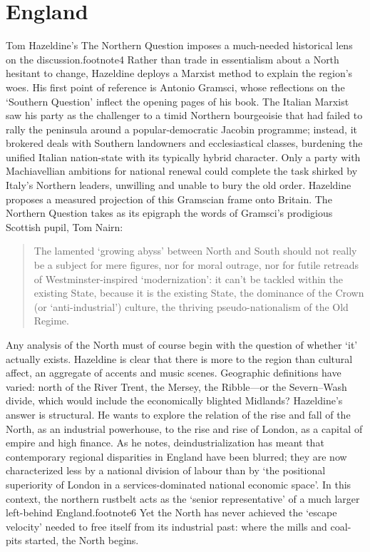 \documentclass[
]{book}
\begin{document}
\hypertarget{england}{%
\chapter{England}\label{england}}

Tom Hazeldine's The Northern Question imposes a much-needed historical lens on the discussion.footnote4 Rather than trade in essentialism about a North hesitant to change, Hazeldine deploys a Marxist method to explain the region's woes. His first point of reference is Antonio Gramsci, whose reflections on the `Southern Question' inflect the opening pages of his book. The Italian Marxist saw his party as the challenger to a timid Northern bourgeoisie that had failed to rally the peninsula around a popular-democratic Jacobin programme; instead, it brokered deals with Southern landowners and ecclesiastical classes, burdening the unified Italian nation-state with its typically hybrid character. Only a party with Machiavellian ambitions for national renewal could complete the task shirked by Italy's Northern leaders, unwilling and unable to bury the old order. Hazeldine proposes a measured projection of this Gramscian frame onto Britain. The Northern Question takes as its epigraph the words of Gramsci's prodigious Scottish pupil, Tom Nairn:

\begin{quote}
The lamented `growing abyss' between North and South should not really be a subject for mere figures, nor for moral outrage, nor for futile retreads of Westminster-inspired `modernization': it can't be tackled within the existing State, because it is the existing State, the dominance of the Crown (or `anti-industrial') culture, the thriving pseudo-nationalism of the Old Regime.
\end{quote}

Any analysis of the North must of course begin with the question of whether `it' actually exists. Hazeldine is clear that there is more to the region than cultural affect, an aggregate of accents and music scenes. Geographic definitions have varied: north of the River Trent, the Mersey, the Ribble---or the Severn--Wash divide, which would include the economically blighted Midlands? Hazeldine's answer is structural. He wants to explore the relation of the rise and fall of the North, as an industrial powerhouse, to the rise and rise of London, as a capital of empire and high finance. As he notes, deindustrialization has meant that contemporary regional disparities in England have been blurred; they are now characterized less by a national division of labour than by `the positional superiority of London in a services-dominated national economic space'. In this context, the northern rustbelt acts as the `senior representative' of a much larger left-behind England.footnote6 Yet the North has never achieved the `escape velocity' needed to free itself from its industrial past: where the mills and coal-pits started, the North begins.
\end{document}
